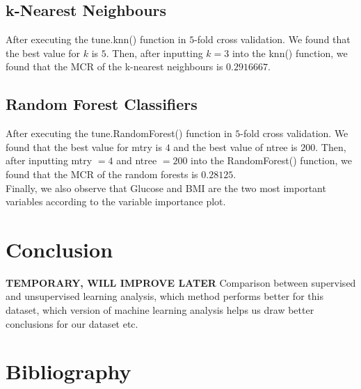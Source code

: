 \documentclass[12pt]{article}
\begin{document}
\subsection{k-Nearest Neighbours}

After executing the tune.knn() function in $5$-fold cross validation. We found that the best value for $k$ is $5$. Then, after inputting $k=3$ into the knn() function, we found that the MCR of the k-nearest neighbours is $0.2916667$.

\subsection{Random Forest Classifiers}

After executing the tune.RandomForest() function in $5$-fold cross validation. We found that the best value for mtry is $4$ and the best value of ntree is $200$. Then, after inputting mtry $=4$ and ntree $=200$ into the RandomForest() function, we found that the MCR of the random forests is $0.28125$. \\
Finally, we also observe that Glucose and BMI are the two most important variables according to the variable importance plot.



\section{Conclusion}

\textbf{TEMPORARY, WILL IMPROVE LATER} Comparison between supervised and unsupervised learning analysis, which method performs better for this dataset, which version of machine learning analysis helps us draw better conclusions for our dataset etc. 

 \section{Bibliography}
  
 
\end{document}
